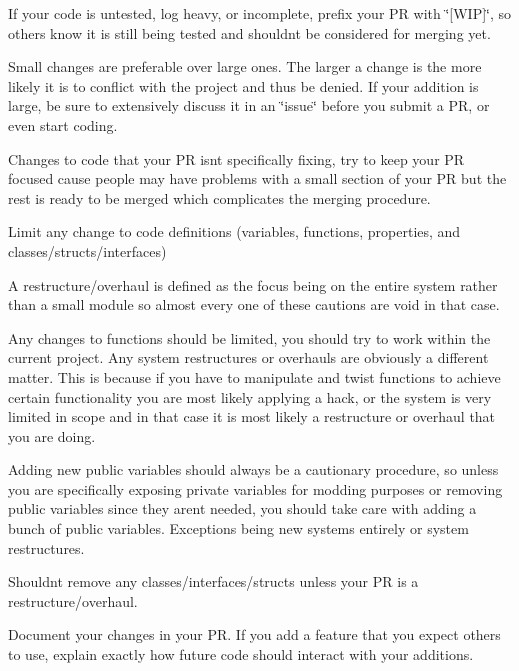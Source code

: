 \begin{DoxyItemize}
If your code is untested, log heavy, or incomplete, prefix your PR with \char`\"{}\mbox{[}\+W\+I\+P\mbox{]}\char`\"{}, so others know it is still being tested and shouldn\textquotesingle{}t be considered for merging yet.
\item Small changes are preferable over large ones. The larger a change is the more likely it is to conflict with the project and thus be denied. If your addition is large, be sure to extensively discuss it in an \char`\"{}issue\char`\"{} before you submit a PR, or even start coding.
\item Changes to code that your PR isn\textquotesingle{}t specifically fixing, try to keep your PR focused cause people may have problems with a small section of your PR but the rest is ready to be merged which complicates the merging procedure.
\item Limit any change to code definitions (variables, functions, properties, and classes/structs/interfaces)
\begin{DoxyItemize}
\item A restructure/overhaul is defined as the focus being on the entire system rather than a small module so almost every one of these \textquotesingle{}cautions\textquotesingle{} are void in that case.
\item Any changes to functions should be limited, you should try to work \textquotesingle{}within\textquotesingle{} the current project. Any system \textquotesingle{}restructures\textquotesingle{} or overhauls are obviously a different matter. This is because if you have to manipulate and twist functions to achieve certain functionality you are most likely applying a hack, or the system is very limited in scope and in that case it is most likely a restructure or overhaul that you are doing.
\item Adding new public variables should always be a cautionary procedure, so unless you are specifically exposing private variables for modding purposes or removing public variables since they aren\textquotesingle{}t needed, you should take care with adding a bunch of public variables. Exceptions being new systems entirely or system restructures.
\item Shouldn\textquotesingle{}t remove any classes/interfaces/structs unless your PR is a restructure/overhaul.
\end{DoxyItemize}
\item Document your changes in your PR. If you add a feature that you expect others to use, explain exactly how future code should interact with your additions.

\end{DoxyItemize}
